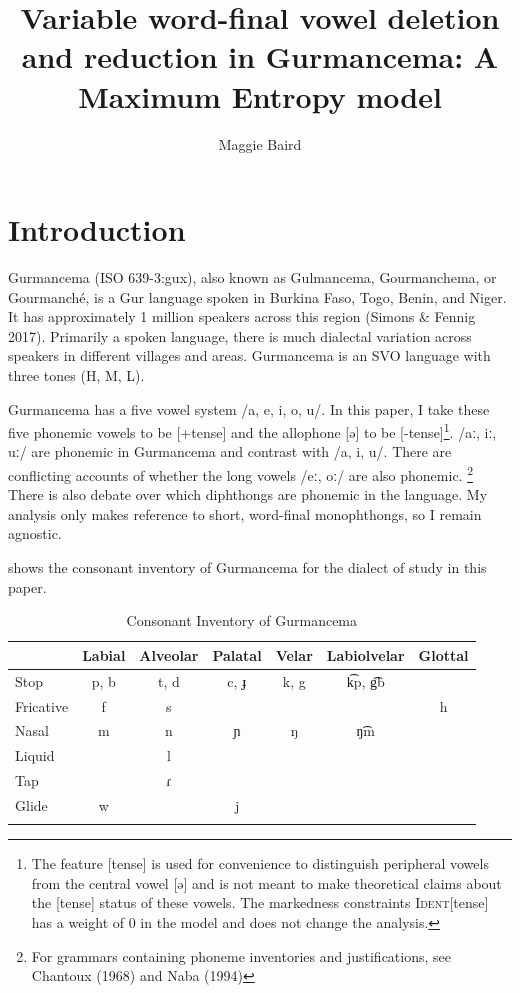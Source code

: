 \documentclass[output=paper,newtxmath,modfonts,nonflat,draftmode]{langsci/langscibook}
\title{Variable word-final vowel deletion and reduction in Gurmancema: A Maximum Entropy model}
\author{Maggie Baird\affiliation{Dartmouth College}}
\begin{document}
 

\maketitle
\section{Introduction} 
Gurmancema (ISO 639-3:gux), also known as Gulmancema, Gourmanchema, or Gourmanché, is a Gur language spoken in Burkina Faso, Togo, Benin, and Niger. It has approximately 1 million speakers across this region \cite{ethnologue}(Simons \& Fennig 2017). Primarily a spoken language, there is much dialectal variation across speakers in different villages and areas. Gurmancema is an SVO language with three tones (H, M, L). 

Gurmancema has a five vowel system /a, e, i, o, u/. In this paper, I take these five phonemic vowels to be [+tense] and the allophone [ə] to be [-tense]\footnote{The feature [tense] is used for convenience to distinguish peripheral vowels from the central vowel [ə] and is not meant to make theoretical claims about the [tense] status of these vowels. The markedness constraints \textsc{Ident}[tense] has a weight of 0 in the model and does not change the analysis.}.  /aː, iː, uː/ are phonemic in Gurmancema and contrast with /a, i, u/. There are conflicting accounts of whether the long vowels /eː, oː/ are also phonemic. \footnote{For grammars containing phoneme inventories and justifications, see Chantoux (1968) and Naba 
(1994)}
There is also debate over which diphthongs are phonemic in the language. My 
analysis only makes reference to short, word-final monophthongs, so I remain 
agnostic.

 shows the consonant inventory of Gurmancema for the dialect of study in this paper. 

\begin{table}
\caption{Consonant Inventory of Gurmancema}
\label{tab:baird:1}
\begin{tabularx}{\textwidth}{Xcccccc}
\lsptoprule
  & Labial & Alveolar & Palatal & Velar & Labiolvelar & Glottal\\ 
 \midrule
 Stop & p, b & t, d & c, ɟ & k, g & k͡p, g͡b & \\
 Fricative & f & s &  &  &  & h\\
 Nasal & m & n & ɲ & ŋ & ŋ͡m & \\
 Liquid &  & l &  &  & & \\
 Tap &  & ɾ  &  &  &  & \\
 Glide & w & & j & &  & \\
 \lspbottomrule
\lspbottomrule\end{tabularx}
\end{table}
\end{document}
